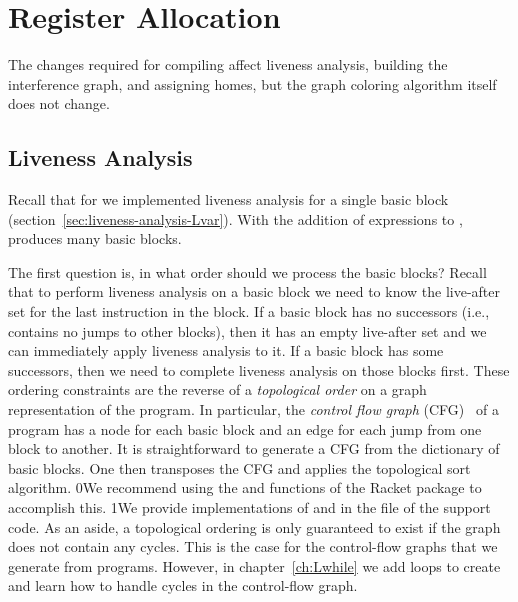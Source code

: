 \documentclass[7x10]{TimesAPriori_MIT}%
\def\racketEd{0}
\def\pythonEd{1}
\def\edition{1}
\newcommand{\racket}[1]{{\if\edition\racketEd{#1}\fi}}
\newcommand{\pythonColor}[0]{}
\newcommand{\python}[1]{{\if\edition\pythonEd\pythonColor #1\fi}}
\numberwithin{theorem}{chapter}
\numberwithin{definition}{chapter}
\numberwithin{equation}{chapter}
\begin{document}
\section{Register Allocation}
\label{sec:register-allocation-Lif}

The changes required for compiling \LangIf{} affect liveness analysis,
building the interference graph, and assigning homes, but the graph
coloring algorithm itself does not change.

\subsection{Liveness Analysis}
\label{sec:liveness-analysis-Lif}

Recall that for \LangVar{} we implemented liveness analysis for a
single basic block (section~\ref{sec:liveness-analysis-Lvar}).  With
the addition of  expressions to \LangIf{},
 produces many basic blocks.


The first question is, in what order should we process the basic blocks?
Recall that to perform liveness analysis on a basic block we need to
know the live-after set for the last instruction in the block. If a
basic block has no successors (i.e., contains no jumps to other
blocks), then it has an empty live-after set and we can immediately
apply liveness analysis to it. If a basic block has some successors,
then we need to complete liveness analysis on those blocks
first. These ordering constraints are the reverse of a
\emph{topological order} on a graph
representation of the program.  In particular, the \emph{control flow
  graph} (CFG)~\citep{Allen:1970uq}
of a program has a node for each basic block and an edge for each jump
from one block to another.  It is straightforward to generate a CFG
from the dictionary of basic blocks. One then transposes the CFG and
applies the topological sort algorithm.
%
%
\racket{We recommend using the  and 
  functions of the Racket \code{graph} package to accomplish this.}
%
\python{We provide implementations of  and
  \code{transpose} in the file \code{graph.py} of the support code.}
%
As an aside, a topological ordering is only guaranteed to exist if the
graph does not contain any cycles. This is the case for the
control-flow graphs that we generate from \LangIf{} programs.
However, in chapter~\ref{ch:Lwhile} we add loops to create \LangLoop{}
and learn how to handle cycles in the control-flow graph.
\end{document}
